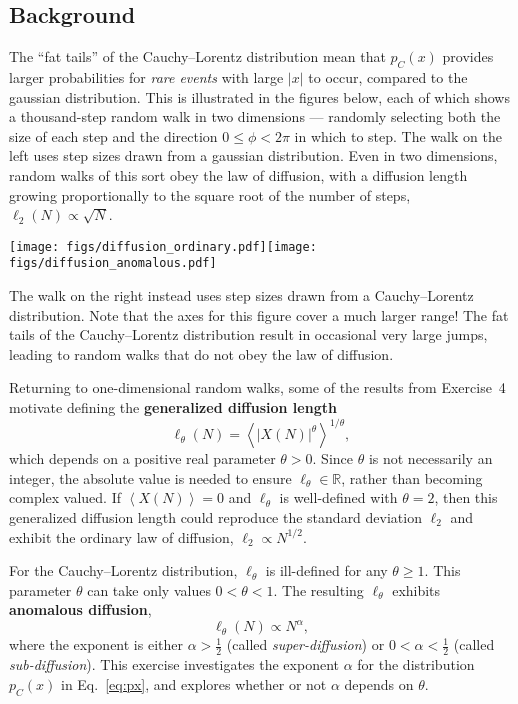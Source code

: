 \documentclass[12 pt]{article} %
\newcommand{\Rbb}{\ensuremath{\mathbb R} }
\newcommand{\al}{\ensuremath{\alpha} }
\newcommand{\vev}[1]{\ensuremath{\left\langle #1 \right\rangle} }
\newcommand{\eq}[1]{Eq.~\ref{#1}}
\begin{document}
\subsection*{Background}
The ``fat tails'' of the Cauchy--Lorentz distribution mean that $p_C(x)$ provides larger probabilities for \textit{rare events} with large $|x|$ to occur, compared to the gaussian distribution.
This is illustrated in the figures below, each of which shows a thousand-step random walk in two dimensions --- randomly selecting both the size of each step and the direction $0 \leq \phi < 2\pi$ in which to step.
The walk on the left uses step sizes drawn from a gaussian distribution.
Even in two dimensions, random walks of this sort obey the law of diffusion, with a diffusion length growing proportionally to the square root of the number of steps, $\ell_2(N) \propto \sqrt{N}$.

\noindent\texttt{[image: figs/diffusion\_ordinary.pdf]}\hfill \texttt{[image: figs/diffusion\_anomalous.pdf]}

The walk on the right instead uses step sizes drawn from a Cauchy--Lorentz distribution.
Note that the axes for this figure cover a much larger range!
The fat tails of the Cauchy--Lorentz distribution result in occasional very large jumps, leading to random walks that do not obey the law of diffusion.

Returning to one-dimensional random walks, some of the results from Exercise~4 motivate defining the \textbf{generalized diffusion length}
\begin{equation}
  \label{eq:diff_length}
  \ell_{\theta}(N) = \vev{|X(N)|^{\theta}}^{1 / \theta},
\end{equation}
which depends on a positive real parameter $\theta > 0$.
Since $\theta$ is not necessarily an integer, the absolute value is needed to ensure $\ell_{\theta} \in \Rbb$, rather than becoming complex valued.
If $\vev{X(N)} = 0$ and $\ell_{\theta}$ is well-defined with $\theta = 2$, then this generalized diffusion length could reproduce the standard deviation $\ell_2$ and exhibit the ordinary law of diffusion, $\ell_2 \propto N^{1 / 2}$.

For the Cauchy--Lorentz distribution, $\ell_{\theta}$ is ill-defined for any $\theta \geq 1$.
This parameter $\theta$ can take only values $0 < \theta < 1$.
The resulting $\ell_{\theta}$ exhibits \textbf{anomalous diffusion},
\begin{equation*}
  \ell_{\theta}(N) \propto N^{\al},
\end{equation*}
where the exponent is either $\al > \frac{1}{2}$ (called \textit{super-diffusion}) or $0 < \al < \frac{1}{2}$ (called \textit{sub-diffusion}).
This exercise investigates the exponent \al for the distribution $p_C(x)$ in \eq{eq:px}, and explores whether or not \al depends on $\theta$.
\end{document}
